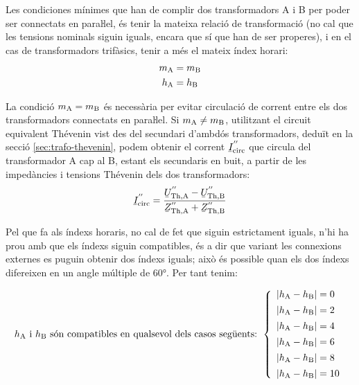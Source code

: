 Les condiciones mínimes que han de complir dos transformadors A i B per poder ser connectats en paraŀlel, és tenir la mateixa relació de transformació (no cal que les tensions nominals siguin iguals, encara que sí que han de ser properes), i en el cas de transformadors trifàsics, tenir a més el mateix índex horari:
\begin{align}
    m_\mathrm{A} &= m_\mathrm{B}\\
    h_\mathrm{A} &= h_\mathrm{B}
\end{align}

La condició $m_\mathrm{A} = m_\mathrm{B}$ és necessària per evitar circulació de corrent entre els dos transformadors connectats en paraŀlel. Si $m_\mathrm{A} \neq m_\mathrm{B}$, utilitzant el circuit equivalent  Thévenin vist des del secundari d'ambdós transformadors, deduït en la secció \vref{sec:trafo-thevenin}, podem obtenir el corrent $\cmplx{I}\ped{circ}^{''}$ que circula del transformador A cap al B, estant els secundaris en buit, a partir de les impedàncies i tensions Thévenin dels dos transformadors:
\begin{equation}
    \cmplx{I}\ped{circ}^{''} = \frac{\cmplx{U}\ped{Th,A}^{''}-\cmplx{U}\ped{Th,B}^{''}}{\cmplx{Z}\ped{Th,A}^{''}+
    \cmplx{Z}\ped{Th,B}^{''}}
\end{equation}

Pel que fa als índexs horaris, no cal de fet que siguin estrictament iguals, n'hi ha prou amb que els índexs siguin compatibles, és a dir que variant les connexions externes es puguin obtenir dos índexs iguals; això és possible quan els dos índexs difereixen en un angle múltiple de \ang{60}. Per tant tenim:

\begin{equation}
    h_\mathrm{A} \text{ i } h_\mathrm{B} \text{ són compatibles en qualsevol dels casos següents: }
    \left\{
        \begin{array}{l}
           |h_\mathrm{A} - h_\mathrm{B}| = 0 \\[1ex]
           |h_\mathrm{A} - h_\mathrm{B}| = 2 \\[1ex]
           |h_\mathrm{A} - h_\mathrm{B}| = 4 \\[1ex]
           |h_\mathrm{A} - h_\mathrm{B}| = 6 \\[1ex]
           |h_\mathrm{A} - h_\mathrm{B}| = 8 \\[1ex]
           |h_\mathrm{A} - h_\mathrm{B}| = 10
        \end{array}
    \right.
    \label{eq:index_comp}
\end{equation}


